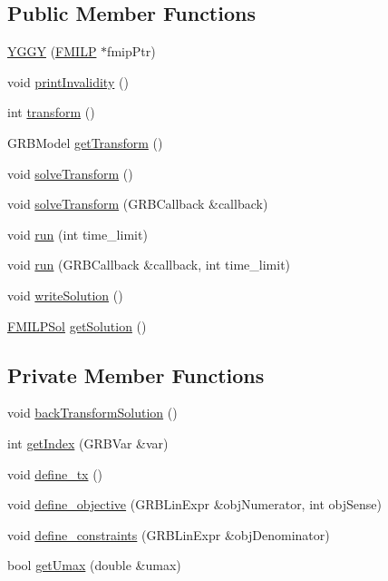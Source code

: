 \subsection*{Public Member Functions}
\begin{DoxyCompactItemize}
\item 
\hyperlink{classgrbfrc_1_1YGGY_a43933f9a8134933a5489df9c9b267017}{Y\+G\+GY} (\hyperlink{classgrbfrc_1_1FMILP}{F\+M\+I\+LP} $\ast$fmip\+Ptr)
\item 
void \hyperlink{classgrbfrc_1_1YGGY_a068a55b107fe9b26c3fd37b688fd947e}{print\+Invalidity} ()
\item 
int \hyperlink{classgrbfrc_1_1YGGY_a0f4e7c79444b5c6cc146d4dd769b55ed}{transform} ()
\item 
G\+R\+B\+Model \hyperlink{classgrbfrc_1_1YGGY_a5d6fb6ae70b9a6ae1abe9b83d58d2ec3}{get\+Transform} ()
\item 
void \hyperlink{classgrbfrc_1_1YGGY_aa1ca08b8d6a8a0102a2a76c34131bf32}{solve\+Transform} ()
\item 
void \hyperlink{classgrbfrc_1_1YGGY_a88f927df51b32619824ede7158962a57}{solve\+Transform} (G\+R\+B\+Callback \&callback)
\item 
void \hyperlink{classgrbfrc_1_1YGGY_a83e8b3c482649ac90c40429664ee58a9}{run} (int time\+\_\+limit)
\item 
void \hyperlink{classgrbfrc_1_1YGGY_a5999584d1a292a3edd1d240049a9e061}{run} (G\+R\+B\+Callback \&callback, int time\+\_\+limit)
\item 
void \hyperlink{classgrbfrc_1_1YGGY_a3928f0ae2a03685c2f68408f5ac00e28}{write\+Solution} ()
\item 
\hyperlink{structgrbfrc_1_1FMILPSol}{F\+M\+I\+L\+P\+Sol} \hyperlink{classgrbfrc_1_1YGGY_a4d9cb33f895777682d5b0a3ef3dac9e1}{get\+Solution} ()
\end{DoxyCompactItemize}
\subsection*{Private Member Functions}
\begin{DoxyCompactItemize}
\item 
void \hyperlink{classgrbfrc_1_1YGGY_a4422be183457b40bc52c55513bcb6959}{back\+Transform\+Solution} ()
\item 
int \hyperlink{classgrbfrc_1_1YGGY_ac927b33921438e06b02a766b134d2089}{get\+Index} (G\+R\+B\+Var \&var)
\item 
void \hyperlink{classgrbfrc_1_1YGGY_a15b9f6f722a0b9cd36e540aca58ba483}{define\+\_\+tx} ()
\item 
void \hyperlink{classgrbfrc_1_1YGGY_a50330b6c73df5005ba5b303e7feb3917}{define\+\_\+objective} (G\+R\+B\+Lin\+Expr \&obj\+Numerator, int obj\+Sense)
\item 
void \hyperlink{classgrbfrc_1_1YGGY_af6f49dee6ff5b2d40d1cd726065ba437}{define\+\_\+constraints} (G\+R\+B\+Lin\+Expr \&obj\+Denominator)
\item 
bool \hyperlink{classgrbfrc_1_1YGGY_afe0f69f05c5d01ec48f510918eda7c94}{get\+Umax} (double \&umax)
\end{DoxyCompactItemize}
